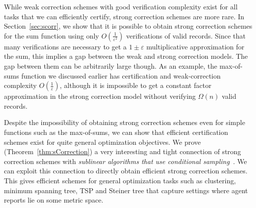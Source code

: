   While weak correction schemes with good verification complexity exist for all tasks that we can efficiently certify, strong correction schemes are
more rare. In Section~\ref{sec:scorr}, we show that it is possible to obtain strong correction schemes for the sum function using only
$O(\frac 1 {\varepsilon^2})$ verifications of valid records. Since that many verifications are necessary to get a $1 \pm \varepsilon$ multiplicative
approximation for the sum, this implies a gap between the weak and strong correction models. The gap between them can be arbitrarily large though. As an example, the max-of-sums function we discussed earlier has certification and weak-correction complexity $O(\frac 1 {\varepsilon})$, although it is impossible to get a constant factor approximation in the strong correction model without verifying $\Omega(n)$ valid records.

  Despite the impossibility of obtaining strong correction schemes even for simple functions such as the max-of-sums, we can show that efficient
certification schemes exist for quite general optimization objectives. We prove (Theorem~\ref{thm:sCorrection}) a very interesting and tight connection
of strong correction schemes with \textit{sublinear algorithms that use conditional sampling}~\cite{GouleakisTZ2017}. We can exploit this connection to
directly obtain efficient strong correction schemes. This gives efficient schemes for general optimization tasks such as clustering, minimum spanning tree,
TSP and Steiner tree that capture settings where agent reports lie on some metric space.

